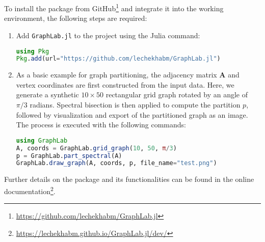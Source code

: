 \documentclass[../paper.tex]{subfiles}
\begin{document}
    To install the package from GitHub\footnote{\url{https://github.com/lechekhabm/GraphLab.jl}} and integrate it into the working environment, the following steps are required:

    \begin{enumerate}
        \item Add \texttt{GraphLab.jl} to the project using the Julia command:
\begin{lstlisting}[language = Julia]
using Pkg
Pkg.add(url="https://github.com/lechekhabm/GraphLab.jl")
\end{lstlisting}
        \item As a basic example for graph partitioning, the adjacency matrix $\mathbf{A}$ and vertex coordinates
        are first constructed from the input data.
        Here, we generate a synthetic $10 \times 50$ rectangular grid graph rotated by an angle of $\pi/3$ radians.
        Spectral bisection is then applied to compute the partition $p$, followed by visualization and export of the partitioned graph as an image. The process is executed with the following commands:
\begin{lstlisting}[language = Julia]
using GraphLab
A, coords = GraphLab.grid_graph(10, 50, π/3)
p = GraphLab.part_spectral(A)
GraphLab.draw_graph(A, coords, p, file_name="test.png")
\end{lstlisting}

    \end{enumerate}
Further details on the package and its functionalities can be found in the online documentation\footnote{\url{https://lechekhabm.github.io/GraphLab.jl/dev/}}.
    
\end{document}

